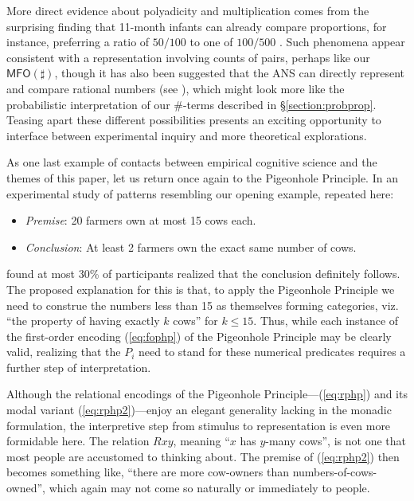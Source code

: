 \documentclass[12pt,oneside,reqno]{amsart}
\theoremstyle{definition}
\begin{document}
More direct evidence about polyadicity and multiplication comes from the surprising finding that 11-month infants can already compare proportions, for instance, preferring a ratio of $50/100$ to one of $100/500$ \citep{Denison}. Such phenomena appear consistent with a representation involving counts of pairs, perhaps like our $\mathsf{MFO}(\sharp)$, though it has also been suggested that the ANS can directly represent and compare rational numbers (see  \citealt{ClarkBeck}), which might look more like the probabilistic interpretation of our $\#$-terms described in \S\ref{section:probprop}. Teasing apart these different possibilities presents an exciting opportunity to interface between experimental inquiry and more theoretical explorations. 

As one last example of contacts between empirical cognitive science and the themes of this paper, let us return once again to the Pigeonhole Principle. In an experimental study of patterns resembling our opening example, repeated here:
\begin{itemize}
    \item[] \textit{Premise}: 20 farmers own at most 15 cows each.
    \item[] \textit{Conclusion}: At least 2 farmers own the exact same number of cows.
\end{itemize}
\cite{Sperber} found at most 30\% of participants realized that the conclusion definitely follows. The proposed explanation for this is that, to apply the Pigeonhole Principle we need to construe the numbers less than 15 as themselves forming categories, viz. ``the property of having exactly $k$ cows'' for $k\leq 15$. Thus, while each instance of the first-order encoding (\ref{eq:fophp}) of the Pigeonhole Principle may be clearly valid, realizing that the $P_i$ need to stand for these numerical predicates requires a further step of interpretation. 

Although the relational encodings of the Pigeonhole Principle---(\ref{eq:rphp}) and its modal variant (\ref{eq:rphp2})---enjoy an elegant generality lacking in the monadic formulation, the interpretive step from stimulus to representation is even more formidable here. The relation $Rxy$, meaning ``$x$ has $y$-many cows'', is not one that most people are accustomed to thinking about. The premise of (\ref{eq:rphp2}) then becomes something like, ``there are more cow-owners than numbers-of-cows-owned'', which again may not come so naturally or immediately to people. 
\end{document}

